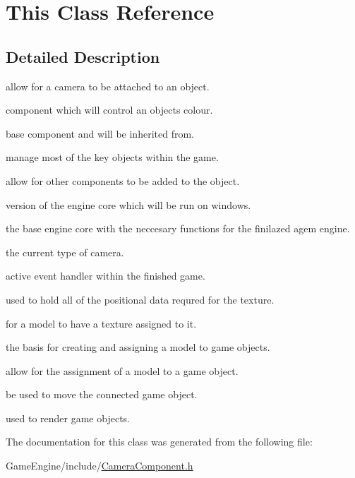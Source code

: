 \hypertarget{class_this}{}\section{This Class Reference}
\label{class_this}


\subsection{Detailed Description}
allow for a camera to be attached to an object.

component which will control an objects colour.

base component and will be inherited from.

manage most of the key objects within the game.

allow for other components to be added to the object.

version of the engine core which will be run on windows.

the base engine core with the neccesary functions for the finilazed agem engine.

the current type of camera.

active event handler within the finished game.

used to hold all of the positional data requred for the texture.

for a model to have a texture assigned to it.

the basis for creating and assigning a model to game objects.

allow for the assignment of a model to a game object.

be used to move the connected game object.

used to render game objects. 

The documentation for this class was generated from the following file\+:\begin{DoxyCompactItemize}
\item 
Game\+Engine/include/\mbox{\hyperlink{_camera_component_8h}{Camera\+Component.\+h}}\end{DoxyCompactItemize}
